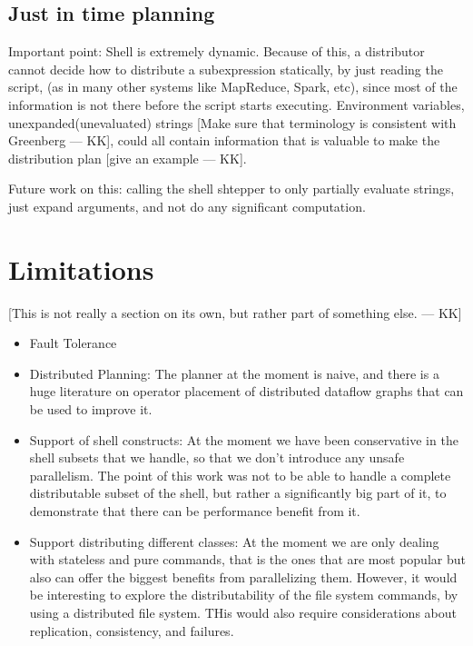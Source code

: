 \documentclass[sigplan,10pt,review,anonymous]{acmart}
\newcommand{\kk}[1]{[{\color{magenta}#1 --- KK}]}
\begin{document}
\subsection{Just in time planning}

Important point: Shell is extremely dynamic. Because of this, a
distributor cannot decide how to distribute a subexpression
statically, by just reading the script, (as in many other systems like
MapReduce, Spark, etc), since most of the information is not there
before the script starts executing. Environment variables,
unexpanded(unevaluated) strings \kk{Make sure that terminology is
  consistent with Greenberg}, could all contain information that is
valuable to make the distribution plan \kk{give an example}.


Future work on this: calling the shell shtepper to only partially
evaluate strings, just expand arguments, and not do any significant
computation.


\section{Limitations}

\kk{This is not really a section on its own, but rather part of something else.}

\begin{itemize}
\item Fault Tolerance
\item Distributed Planning: The planner at the moment is naive, and
  there is a huge literature on operator placement of distributed
  dataflow graphs that can be used to improve it.
\item Support of shell constructs: At the moment we have been
  conservative in the shell subsets that we handle, so that we don't
  introduce any unsafe parallelism. The point of this work was not to
  be able to handle a complete distributable subset of the shell, but
  rather a significantly big part of it, to demonstrate that there can
  be performance benefit from it.
\item Support distributing different classes: At the moment we are
  only dealing with stateless and pure commands, that is the ones that
  are most popular but also can offer the biggest benefits from
  parallelizing them. However, it would be interesting to explore the
  distributability of the file system commands, by using a distributed
  file system. THis would also require considerations about
  replication, consistency, and failures.
\end{itemize}
\end{document}
